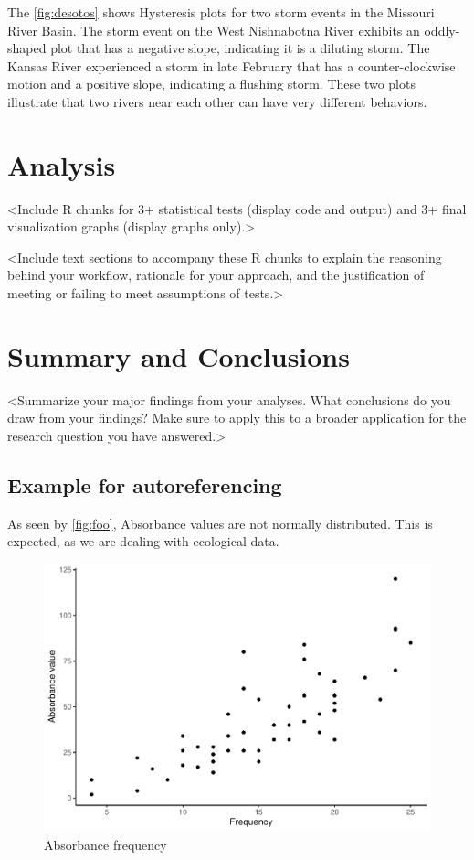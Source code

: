 \documentclass[12pt,]{article}
\begin{document}
The \autoref{fig:desotos} shows Hysteresis plots for two storm events in
the Missouri River Basin. The storm event on the West Nishnabotna River
exhibits an oddly-shaped plot that has a negative slope, indicating it
is a diluting storm. The Kansas River experienced a storm in late
February that has a counter-clockwise motion and a positive slope,
indicating a flushing storm. These two plots illustrate that two rivers
near each other can have very different behaviors.

\newpage

\hypertarget{analysis}{%
\section{Analysis}\label{analysis}}

\textless Include R chunks for 3+ statistical tests (display code and
output) and 3+ final visualization graphs (display graphs
only).\textgreater{}

\textless Include text sections to accompany these R chunks to explain
the reasoning behind your workflow, rationale for your approach, and the
justification of meeting or failing to meet assumptions of
tests.\textgreater{}

\newpage

\hypertarget{summary-and-conclusions}{%
\section{Summary and Conclusions}\label{summary-and-conclusions}}

\textless Summarize your major findings from your analyses. What
conclusions do you draw from your findings? Make sure to apply this to a
broader application for the research question you have
answered.\textgreater{}

\hypertarget{example-for-autoreferencing}{%
\subsection{Example for
autoreferencing}\label{example-for-autoreferencing}}

As seen by \autoref{fig:foo}, Absorbance values are not normally
distributed. This is expected, as we are dealing with ecological data.

\begin{figure}
\centering
\includegraphics{Project_Template_files/figure-latex/foo-1.pdf}
\caption{\label{fig:foo}Absorbance frequency}
\end{figure}
\end{document}
